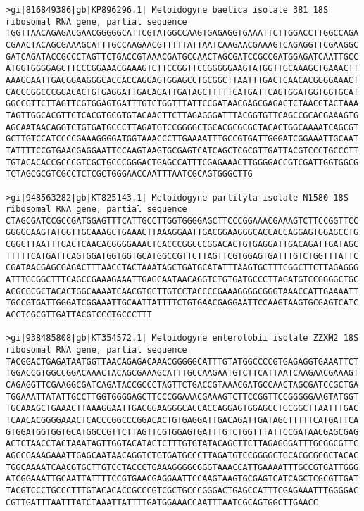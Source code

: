 \documentclass[11pt]{article}
\begin{document}
\begin{Verbatim}[commandchars=\\\{\}]
>gi|816849386|gb|KP896296.1| Meloidogyne baetica isolate 381 18S ribosomal RNA gene, partial sequence
TGGTTAACAGAGACGAACGGGGGCATTCGTATGGCCAAGTGAGAGGTGAAATTCTTGGACCTTGGCCAGA
CGAACTACAGCGAAAGCATTTGCCAAGAACGTTTTTATTAATCAAGAACGAAAGTCAGAGGTTCGAAGGC
GATCAGATACCGCCCTAGTTCTGACCGTAAACGATGCCAACTAGCGATCCGCCGATGGAGATCAATTGCC
ATGGTGGGGAGCTTCCCGGAAACGAAAGTCTTCCGGTTCCGGGGGAAGTATGGTTGCAAAGCTGAAACTT
AAAGGAATTGACGGAAGGGCACCACCAGGAGTGGAGCCTGCGGCTTAATTTGACTCAACACGGGGAAACT
CACCCGGCCCGGACACTGTGAGGATTGACAGATTGATAGCTTTTTCATGATTCAGTGGATGGTGGTGCAT
GGCCGTTCTTAGTTCGTGGAGTGATTTGTCTGGTTTATTCCGATAACGAGCGAGACTCTAACCTACTAAA
TAGTTGGCACGTTCTCACGTGCGTGTACAACTTCTTAGAGGGATTTACGGTGTTCAGCCGCACGAAAGTG
AGCAATAACAGGTCTGTGATGCCCTTAGATGTCCGGGGCTGCACGCGCGCTACACTGGCAAAATCAGCGT
GCTTGTCCATCCCCGAAAGGGGATGGTAAACCCTTGAAAATTTGCCGTGATTGGGATCGGAAATTGCAAT
TATTTTCCGTGAACGAGGAATTCCAAGTAAGTGCGAGTCATCAGCTCGCGTTGATTACGTCCCTGCCCTT
TGTACACACCGCCCGTCGCTGCCCGGGACTGAGCCATTTCGAGAAACTTGGGGACCGTCGATTGGTGGCG
TCTAGCGCGTCGCCTCTCGCTGGGAACCAATTTAATCGCAGTGGGCTTG

>gi|948563282|gb|KT825143.1| Meloidogyne partityla isolate N1580 18S ribosomal RNA gene, partial sequence
CTAGCGATCCGCCGATGGAGTTTCATTGCCTTGGTGGGGAGCTTCCCGGAAACGAAAGTCTTCCGGTTCC
GGGGGAAGTATGGTTGCAAAGCTGAAACTTAAAGGAATTGACGGAAGGGCACCACCAGGAGTGGAGCCTG
CGGCTTAATTTGACTCAACACGGGGAAACTCACCCGGCCCGGACACTGTGAGGATTGACAGATTGATAGC
TTTTTCATGATTCAGTGGATGGTGGTGCATGGCCGTTCTTAGTTCGTGGAGTGATTTGTCTGGTTTATTC
CGATAACGAGCGAGACTTTAACCTACTAAATAGCTGATGCATATTTAAGTGCTTTCGGCTTCTTAGAGGG
ATTTGCGGCTTTCAGCCGAAAGAAATTGAGCAATAACAGGTCTGTGATGCCCTTAGATGTCCGGGGCTGC
ACGCGCGCTACACTGGCAAAATCAACGTGCTTGTCCTACCCCGAAAGGGGCGGGTAAACCATTGAAAATT
TGCCGTGATTGGGATCGGAAATTGCAATTATTTTCTGTGAACGAGGAATTCCAAGTAAGTGCGAGTCATC
ACCTCGCGTTGATTACGTCCCTGCCCTTT

>gi|938485808|gb|KT354572.1| Meloidogyne enterolobii isolate ZZXM2 18S ribosomal RNA gene, partial sequence
TACGGACTGAGATAATGGTTAACAGAGACAAACGGGGGCATTTGTATGGCCCCGTGAGAGGTGAAATTCT
TGGACCGTGGCCGGACAAACTACAGCGAAAGCATTTGCCAAGAATGTCTTCATTAATCAAGAACGAAAGT
CAGAGGTTCGAAGGCGATCAGATACCGCCCTAGTTCTGACCGTAAACGATGCCAACTAGCGATCCGCTGA
TGGAAATTATATTGCCTTGGTGGGGAGCTTCCCGGAAACGAAAGTCTTCCGGTTCCGGGGGAAGTATGGT
TGCAAAGCTGAAACTTAAAGGAATTGACGGAAGGGCACCACCAGGAGTGGAGCCTGCGGCTTAATTTGAC
TCAACACGGGGAAACTCACCCGGCCCGGACACTGTGAGGATTGACAGATTGATAGCTTTTTCATGATTCA
GTGGATGGTGGTGCATGGCCGTTCTTAGTTCGTGGAGTGATTTGTCTGGTTTATTCCGATAACGAGCGAG
ACTCTAACCTACTAAATAGTTGGTACATACTCTTTGTGTATACAGCTTCTTAGAGGGATTTGCGGCGTTC
AGCCGAAAGAAATTGAGCAATAACAGGTCTGTGATGCCCTTAGATGTCCGGGGCTGCACGCGCGCTACAC
TGGCAAAATCAACGTGCTTGTCCTACCCTGAAAGGGGCGGGTAAACCATTGAAAATTTGCCGTGATTGGG
ATCGGAAATTGCAATTATTTTCCGTGAACGAGGAATTCCAAGTAAGTGCGAGTCATCAGCTCGCGTTGAT
TACGTCCCTGCCCTTTGTACACACCGCCCGTCGCTGCCCGGGACTGAGCCATTTCGAGAAATTTGGGGAC
CGTTGATTTAATTTATCTAAATTATTTTGATGGAAACCAATTTAATCGCAGTGGCTTGAACC


\end{Verbatim}
\end{document}
